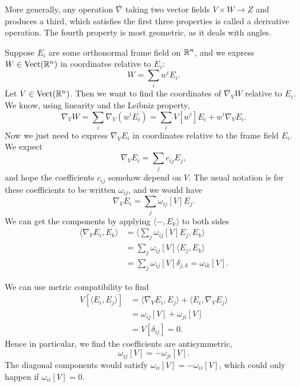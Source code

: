 \begin{remark}
More generally, any operation $\bar\nabla$ taking two vector fields
$V\times W\to Z$ and produces a third, which satisfies the first three
properties is called a derivative operation. The fourth property is most
geometric, as it deals with angles.
\end{remark}


Suppose $E_{i}$ are some orthonormal frame field on $\mathbb{R}^{n}$, and we
express $W\in\operatorname{Vect}(\mathbb{R}^{n})$ in coordinates relative to $E_{i}$:
\begin{equation}
W = \sum_{i}w^{i}E_{i}.
\end{equation}
Let $V\in\operatorname{Vect}(\mathbb{R}^{n})$. Then we want to find the coordinates of
$\nabla_{V}W$ relative to $E_{i}$. We know, using linearity and the
Leibniz property,
\begin{equation}
\nabla_{V}W = \sum_{i}\nabla_{V}(w^{i}E_{i}) = \sum_{i}V[w^{i}]E_{i} + w^{i}\nabla_{V}E_{i}.
\end{equation}
Now we just need to express $\nabla_{V}E_{i}$ in coordinates relative to
the frame field $E_{i}$. We expect
\begin{equation}
\nabla_{V}E_{i} = \sum_{j}c_{ij}E_{j},
\end{equation}
and hope the coefficients $c_{ij}$ somehow depend on $V$. The usual
notation is for these coefficients to be written $\omega_{ij}$, and we
would have
\begin{equation}
\nabla_{V}E_{i} = \sum_{j}\omega_{ij}[V]E_{j}.
\end{equation}
We can get the components by applying $\langle-,E_{k}\rangle$ to both
sides
\begin{subequations}
\begin{align}
\langle\nabla_{V}E_{i},E_{k}\rangle
&=\langle\sum_{j}\omega_{ij}[V]E_{j},E_{k}\rangle\\
&=\sum_{j}\omega_{ij}[V]\langle E_{j},E_{k}\rangle\\
&=\sum_{j}\omega_{ij}[V]\delta_{j,k} = \omega_{ik}[V].
\end{align}
\end{subequations}

\M
We can use metric compatibility to find
\begin{subequations}
\begin{align}
  V[\langle E_{i},E_{j}\rangle] &= \langle\nabla_{V}E_{i},E_{j}\rangle
  + \langle E_{i},\nabla_{V}E_{j}\rangle\\
  &=\omega_{ij}[V] + \omega_{ji}[V]\\
  &= V[\delta_{ij}] = 0.
\end{align}
\end{subequations}
Hence in particular, we find the coefficients are antisymmetric,
\begin{equation}
\boxed{\omega_{ij}[V] =-\omega_{ji}[V].}
\end{equation}
The diagonal components would satisfy $\omega_{ii}[V]=-\omega_{ii}[V]$,
which could only happen if $\omega_{ii}[V]=0$.

